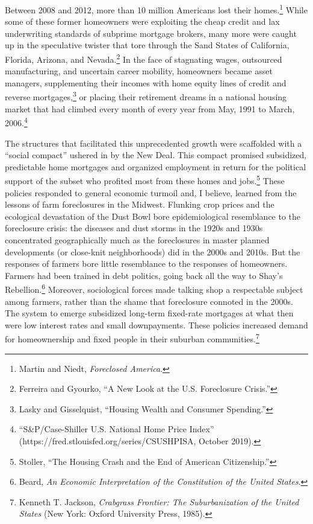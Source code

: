 \documentclass[12pt,oneside]{psthesis}
\begin{document}
Between 2008 and 2012, more than 10 million Americans lost their homes.\footnote{Martin and Niedt, \emph{Foreclosed America}.}
While some of these former homeowners were exploiting the cheap credit and lax underwriting standards of subprime mortgage brokers, many more were caught up in the speculative twister that tore through the Sand States of California, Florida, Arizona, and Nevada.\footnote{Ferreira and Gyourko, ``A New Look at the U.S. Foreclosure Crisis.''}
In the face of stagnating wages, outsourced manufacturing, and uncertain career mobility, homeowners became asset managers, supplementing their incomes with home equity lines of credit and reverse mortgages,\footnote{Lasky and Gisselquist, ``Housing Wealth and Consumer Spending.''} or placing their retirement dreams in a national housing market that had climbed every month of every year from May, 1991 to March, 2006.\footnote{``S\&P/Case-Shiller U.S. National Home Price Index'' (https://fred.stlouisfed.org/series/CSUSHPISA, October 2019).}

The structures that facilitated this unprecedented growth were scaffolded with a ``social compact'' ushered in by the New Deal.
This compact promised subsidized, predictable home mortgages and organized employment in return for the political support of the subset who profited most from these homes and jobs.\footnote{Stoller, ``The Housing Crash and the End of American Citizenship.''}
These policies responded to general economic turmoil and, I believe, learned from the lessons of farm foreclosures in the Midwest.
Flunking crop prices and the ecological devastation of the Dust Bowl bore epidemiological resemblance to the foreclosure crisis: the diseases and dust storms in the 1920s and 1930s concentrated geographically much as the foreclosures in master planned developments (or close-knit neighborhoods) did in the 2000s and 2010s.
But the responses of farmers bore little resemblance to the responses of homeowners.
Farmers had been trained in debt politics, going back all the way to Shay's Rebellion.\footnote{Beard, \emph{An Economic Interpretation of the Constitution of the United States}.}
Moreover, sociological forces made talking shop a respectable subject among farmers, rather than the shame that foreclosure connoted in the 2000s.
The system to emerge subsidized long-term fixed-rate mortgages at what then were low interest rates and small downpayments.
These policies increased demand for homeownership and fixed people in their suburban communities.\footnote{Kenneth T. Jackson, \emph{Crabgrass Frontier: The Suburbanization of the United States} (New York: Oxford University Press, 1985).}
\end{document}
